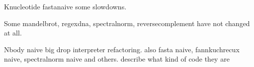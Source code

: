 Knucleotide fastanaive some slowdowns.

Some mandelbrot, regexdna, spectralnorm, reversecomplement have not changed at all.

Nbody naive  big drop interpreter refactoring. also fasta naive, fannkuchrecux naive, spectralnorm naive and others. describe what kind of code they are

\begin{figure}[htbp]
  \caption{\label{fig:}\todo}
  \centering
\end{figure}

\begin{figure}[htbp]
  \caption{\label{fig:}\todo}
  \centering
\end{figure}

